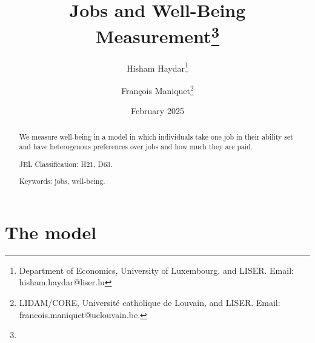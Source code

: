 \documentclass[12pt,thmsb]{article}
\begin{document}
\title{Jobs and Well-Being Measurement\thanks{}}
\author{Hisham Haydar\thanks{Department of Economics, University of Luxembourg, and LISER. Email: hisham.haydar@liser.lu} \and Fran\c{c}ois Maniquet\thanks{LIDAM/CORE, Universit\'{e} catholique de Louvain, and LISER. Email: francois.maniquet@uclouvain.be.}}
\date{February 2025}
\maketitle

\begin{abstract}
We measure well-being in a model in which individuals take one job in their ability set and have heterogenous preferences over jobs and how much they are paid.

JEL Classification: H21, D63.

Keywords: jobs, well-being.
\end{abstract}

\section{The model}
\end{document}
